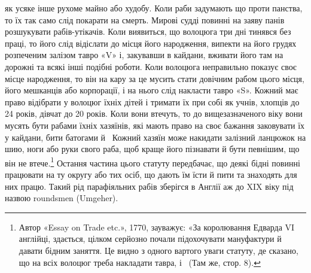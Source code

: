 \parcont{}  %
як усяке інше рухоме майно або худобу. Коли раби задумають
що проти панства, то їх так само слід покарати на смерть. Мирові
судді повинні на заяву панів розшукувати рабів-утікачів.
Коли виявиться, що волоцюга три дні тинявся без праці, то його
слід відіслати до місця його народження, випекти на його грудях
розпеченим залізом тавро «V» і, закувавши в кайдани, вживати
його там на дорожні та всякі інші подібні роботи. Коли волоцюга
неправильно показує своє місце народження, то він на кару
за це мусить стати довічним рабом цього місця, його мешканців
або корпорації, і на нього слід накласти тавро «S». Кожний
має право відібрати у волоцюг їхніх дітей і тримати їх при собі
як учнів, хлопців до 24 років, дівчат до 20 років. Коли вони втечуть,
то до вищезазначеного віку вони мусять бути рабами їхніх
хазяїнів, які мають право на своє бажання заковувати їх у
кайдани, бити батогами й~ Кожний хазяїн може накидати
залізний ланцюжок на шию, ноги або руки свого раба, щоб краще
його пізнавати й бути певнішим, що він не втече.\footnote{
Автор «Essay on Trade etc.», 1770, зауважує: «За королювання
Едварда VI англійці, здається, цілком серйозно почали підохочувати
мануфактури й давати бідним заняття. Це видно з одного вартого уваги
статуту, де сказано, що на всіх волоцюг треба накладати тавра, і~
(Там же, стор. 8).
} Остання
частина цього статуту передбачає, що деякі бідні повинні працювати
на ту округу або тих осіб, що дають їм їсти й пити та знаходять
для них працю. Такий рід парафіяльних рабів зберігся
в Англії аж до XIX віку під назвою roundsmen (Umgeher).


